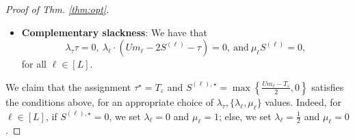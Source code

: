 \documentclass[conference,letterpaper]{IEEEtran}
\theoremstyle{remark}
\theoremstyle{definition}
\begin{document}
\begin{proof}[Proof of Thm. \ref{thm:opt}]
\begin{itemize}
and that $\frac{\partial \mathcal{L}}{\partial S^{(\ell)}} = 0$, for each $\ell\in [L]$, or $\lambda_\ell = \frac{1-\mu_\ell}{2}.$
\item \textbf{Complementary slackness}: We have that $$\lambda_\tau \tau= 0,\ \lambda_\ell\cdot \left(Um_\ell-2S^{(\ell)}-\tau\right) = 0,\ \text{and}\ \mu_\ell S^{(\ell)} = 0,$$
for all $\ell\in [L]$.
\end{itemize}
We claim that the assignment $\tau^\star = T_\varepsilon$ and $S^{(\ell),\star} = \max\left\{\frac{Um_\ell-T_\varepsilon}{2},0\right\}$ satisfies the conditions above, for an appropriate choice of $\lambda_\tau,\{\lambda_\ell,\mu_\ell\}$ values. Indeed, for $\ell\in [L]$, if $S^{(\ell),\star} = 0$, we set $\lambda_\ell = 0$ and $\mu_\ell = 1$; else, we set $\lambda_\ell = \frac12$ and $\mu_\ell = 0$. 

\end{proof}
\end{document}
